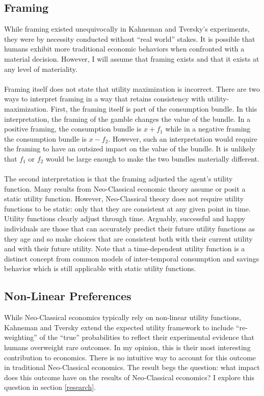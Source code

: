 \documentclass{article}
\begin{document}
\subsection{Framing}

While framing existed unequivocally in Kahneman and Tversky's experiments, they were by necessity conducted without ``real world'' stakes.  It is possible that humans exhibit more traditional economic behaviors when confronted with a material decision.  However, I will assume that framing exists and that it exists at any level of materiality.  
\\
\\
Framing itself does not state that utility maximization is incorrect.  There are two ways to interpret framing in a way that retains consistency with utility-maximization.  First, the framing itself is part of the consumption bundle.  In this interpretation, the framing of the gamble changes the value of the bundle.  In a positive framing, the consumption bundle is \(x+f_1\) while in a negative framing the consumption bundle is \(x-f_2\).  However, such an interpretation would require the framing to have an outsized impact on the value of the bundle.  It is unlikely that \(f_1\) or \(f_2\) would be large enough to make the two bundles materially different.  
\\
\\
The second interpretation is that the framing adjusted the agent's utility function.  Many results from Neo-Classical economic theory assume or posit a static utility function.  However, Neo-Classical theory does not require utility functions to be static: only that they are consistent at any given point in time.  Utility functions clearly adjust through time.  Arguably, successful and happy individuals are those that can accurately predict their future utility functions as they age and so make choices that are consistent both with their current utility and with their future utility.  Note that a time-dependent utility function is a distinct concept from common models of inter-temporal consumption and savings behavior which is still applicable with static utility functions.

\subsection{Non-Linear Preferences}
While Neo-Classical economics typically rely on non-linear utility functions, Kahneman and Tversky extend the expected utility framework to include ``re-weighting'' of the ``true'' probabilities to reflect their experimental evidence that humans overweight rare outcomes.  In my opinion, this is their most interesting contribution to economics.  There is no intuitive way to account for this outcome in traditional Neo-Classical economics.  The result begs the question: what impact does this outcome have on the results of Neo-Classical economics?  I explore this question in section \ref{research}.  
\end{document}
